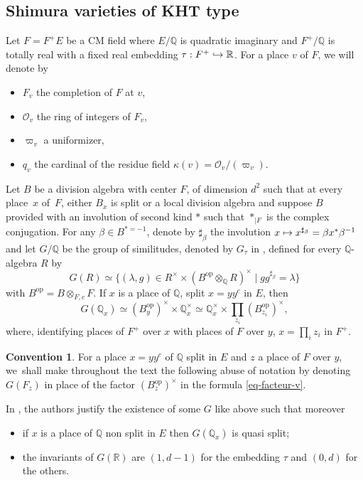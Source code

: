 \documentclass[JEP,XML,SOM,Unicode,published]{cedram}
\def\mto{\mathchoice{\longmapsto}{\mapsto}{\mapsto}{\mapsto}}
\def\hto{\mathrel{\lhook\joinrel\to}}
\let\sep\mid
\newcommand{\op}{\mathrm{op}}
\theoremstyle{plain}
\theoremstyle{definition}
\newtheorem*{convention}{Convention}
\numberwithin{equation}{subsection}
\newcommand\Qm{{\mathbb Q}}
\newcommand\Rm{{\mathbb R}}
\newcommand\OC{{\mathcal O}}
\begin{document}
\subsection{Shimura varieties of KHT type}

\label{para-geo}

Let $F=F^+ E$ be a CM field where $E/\Qm$ is quadratic imaginary and
$F^+/\Qm$ is
totally real with a fixed real embedding \hbox{$\tau:F^+ \hto \Rm$}. For a place $v$ of $F$,
we will denote by
\begin{itemize}
\item $F_v$ the completion of $F$ at $v$,

\item $\OC_v$ the ring of integers of $F_v$,

\item $\varpi_v$ a uniformizer,

\item $q_v$ the cardinal of the residue field $\kappa(v)=\OC_v/(\varpi_v)$.
\end{itemize}
Let $B$ be a division algebra with center $F$, of dimension $d^2$ such that at every place~$x$ of~$F$,
either $B_x$ is split or a local division algebra and suppose $B$ provided with an involution of
second kind $*$ such that $*_{|F}$ is the complex conjugation. For any
$\beta \in B^{*=-1}$, denote by $\sharp_\beta$ the involution $x \mto x^{\sharp_\beta}=\beta x^*
\beta^{-1}$ and let $G/\Qm$ be the group of similitudes, denoted by
$G_\tau$ in \cite{h-t}, defined for every $\Qm$-algebra $R$ by
\[
G(R) \simeq \{(\lambda,g) \in R^\times \times (B^{\op} \otimes_\Qm R)^\times \sep
gg^{\sharp_\beta}=\lambda\}
\]
with $B^{\op}=B \otimes_{F,c} F$.
If $x$ is a place of $\Qm$, split $x=yy^c$ in $E$, then
\begin{equation} \label{eq-facteur-v}
G(\Qm_x) \simeq (B_y^{\op})^\times \times \Qm_x^\times \simeq \Qm_x^\times \times
\prod_{z_i} (B_{z_i}^{\op})^\times,
\end{equation}
where, identifying places of $F^+$ over $x$ with places of $F$ over $y$,
$x=\prod_i z_i$ in $F^+$.

\begin{convention}
For a place $x=yy^c$ of $\Qm$ split in $E$ and $z$
a place of $F$ over $y$, we~shall make throughout the text the following abuse of notation by denoting
$G(F_z)$ in place of the factor $(B_z^{\op})^\times$ in the formula \eqref{eq-facteur-v}.
\end{convention}

In \cite{h-t}, the authors justify the existence of some $G$ like above such that moreover
\begin{itemize}
\item if $x$ is a place of $\Qm$ non split in $E$ then $G(\Qm_x)$ is quasi split;

\item the invariants of $G(\Rm)$ are $(1,d-1)$ for the embedding $\tau$ and $(0,d)$ for the others.
\end{itemize}
\end{document}
